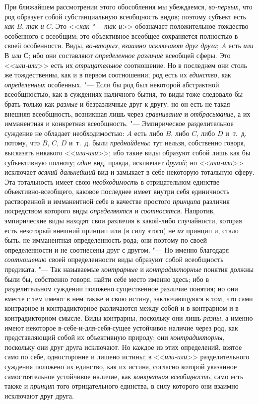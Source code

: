 {При ближайшем рассмотрении этого обособления мы убеждаемся,
{\em во-первых}, что род
образует собой субстанциальную всеобщность видов; поэтому субъект есть
{\em как} $B$, {\em так и} $C$. Это <<{\em как "--- так и}>>
обозначает положительное тождество особенного с всеобщим; это
объективное всеобщее сохраняется полностью в своей особенности. Виды,
{\em во-вторых}, {\em взаимно исключают друг друга}; $A$ есть
{\em или} $В$ {\em или} $С$; ибо они составляют {\em определенное
различие} всеобщей сферы. Это <<{\em или-или}>> есть их {\em отрицательное}
соотношение. Но в последнем они столь же тождественны, как и
в первом соотношении; род есть их {\em единство}, как {\em определенных}
особенных. "--- Если бы род был некоторой
абстрактной всеобщностью, как в суждениях наличного бытия, то виды тоже
следовало бы брать только как {\em разные} и
безразличные друг к другу; но он есть не такая внешняя всеобщность,
возникшая лишь через {\em сравнивание} и {\em отбрасывание},
а их имманентная и конкретная всеобщность. "---
Эмпирическое разделительное суждение не обладает
необходимостью: $A$ есть либо $B$, либо $C$, либо $D$ и~т.~д.
потому, что $B$, $C$, $D$ и~т.~д. были {\em преднайдены}: тут
нельзя, собственно говоря, высказать никакого <<{\em или-или}>>; ибо
такие виды образуют собой лишь как бы субъективную полноту;
{\em один} вид, правда, исключает {\em другой}; но <<{\em или-или}>>
исключает {\em всякий дальнейший} вид и замыкает в себе некоторую
тотальную сферу. Эта тотальность имеет свою {\em необходимость} в
отрицательном единстве объективно-всеобщего, каковое последнее имеет внутри
себя единичность растворенной и имманентной себе в качестве простого
{\em принципа} различия посредством которого виды {\em определяются} и
{\em соотносятся}. Напротив, эмпирические виды находят свои различия в
какой-либо случайности, которая есть некоторый внешний принцип или (в силу
этого) не {\em их} принцип и, стало быть, не имманентная определенность рода;
они поэтому по своей определенности и не соотнесены друг с другом. "---
Но именно благодаря {\em соотношению} своей
определенности виды образуют собой всеобщность предиката. "--- Так называемые
{\em контрарные} и {\em контрадикторные}
понятия должны были бы, собственно говоря, найти себе место
именно здесь; ибо в разделительном суждении положено существенное различие
понятия; но они вместе с тем имеют в нем также и свою истину, заключающуюся
в том, что сами контрарное и контрадикторное различаются между собой и в
контрарном и в контрадикторном смысле. Виды контрарны, поскольку они лишь
{\em разны}, а именно
имеют некоторое в-себе-и-для-себя-сущее устойчивое наличие через род, как
представляющий собой их объективную природу; они {\em контрадикторны},
поскольку они друг друга исключают. Но каждое из этих
определений, взятое само по себе, односторонне и лишено истины; в
<<{\em или-или}>>
разделительного суждения положено их единство, как их истина,
согласно которой указанное самостоятельное устойчивое наличие, как
{\em конкретная всеобщность}, само есть также и {\em принцип} того
отрицательного единства, в силу которого они взаимно исключают друг друга.

}
